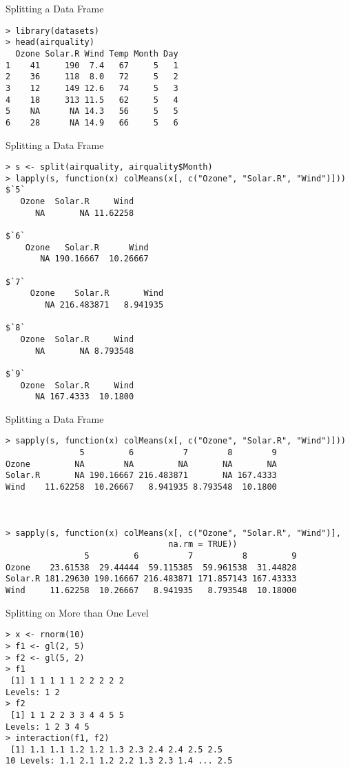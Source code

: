 \documentclass[aspectratio=169]{beamer}
\begin{document}
\begin{frame}[fragile]{Splitting a Data Frame}
\begin{verbatim}
> library(datasets)
> head(airquality)
  Ozone Solar.R Wind Temp Month Day
1    41     190  7.4   67     5   1
2    36     118  8.0   72     5   2
3    12     149 12.6   74     5   3
4    18     313 11.5   62     5   4
5    NA      NA 14.3   56     5   5
6    28      NA 14.9   66     5   6
\end{verbatim}
\end{frame}

\begin{frame}[fragile]{Splitting a Data Frame}
\begin{verbatim}
> s <- split(airquality, airquality$Month)
> lapply(s, function(x) colMeans(x[, c("Ozone", "Solar.R", "Wind")]))
$`5`
   Ozone  Solar.R     Wind 
      NA       NA 11.62258 

$`6`
    Ozone   Solar.R      Wind 
       NA 190.16667  10.26667 

$`7`
     Ozone    Solar.R       Wind 
        NA 216.483871   8.941935 

$`8`
   Ozone  Solar.R     Wind 
      NA       NA 8.793548 

$`9`
   Ozone  Solar.R     Wind 
      NA 167.4333  10.1800 
\end{verbatim}
\end{frame}


\begin{frame}[fragile]{Splitting a Data Frame}
\begin{verbatim}
> sapply(s, function(x) colMeans(x[, c("Ozone", "Solar.R", "Wind")]))
               5         6          7        8        9
Ozone         NA        NA         NA       NA       NA
Solar.R       NA 190.16667 216.483871       NA 167.4333
Wind    11.62258  10.26667   8.941935 8.793548  10.1800



> sapply(s, function(x) colMeans(x[, c("Ozone", "Solar.R", "Wind")], 
                                 na.rm = TRUE))
                5         6          7          8         9
Ozone    23.61538  29.44444  59.115385  59.961538  31.44828
Solar.R 181.29630 190.16667 216.483871 171.857143 167.43333
Wind     11.62258  10.26667   8.941935   8.793548  10.18000
\end{verbatim}
\end{frame}



\begin{frame}[fragile]{Splitting on More than One Level}
\begin{verbatim}
> x <- rnorm(10)
> f1 <- gl(2, 5)
> f2 <- gl(5, 2)
> f1
 [1] 1 1 1 1 1 2 2 2 2 2
Levels: 1 2
> f2
 [1] 1 1 2 2 3 3 4 4 5 5
Levels: 1 2 3 4 5
> interaction(f1, f2)
 [1] 1.1 1.1 1.2 1.2 1.3 2.3 2.4 2.4 2.5 2.5
10 Levels: 1.1 2.1 1.2 2.2 1.3 2.3 1.4 ... 2.5
\end{verbatim}
\end{frame}
\end{document}
